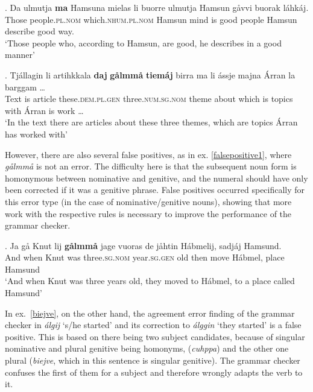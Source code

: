 \documentclass[free]{flammie}
\begin{document}
\exg. Da ulmutja \textbf{ma} Hamsuna mielas li buorre ulmutja Hamsun gåvvi
buorak láhkáj.\label{msyn-mij-gut}\\
Those people\textsc{.pl.nom} which\textsc{.nhum.pl.nom} Hamsun mind is good
people Hamsun describe good way.\\
`Those people who, according to Hamsun, are good, he describes in a good manner'


\exg. Tjállagin li artihkkala \textbf{daj} \textbf{gålmmå} \textbf{tiemáj} birra
ma li ássje majna Árran la barggam \ldots\label{numeral-error}\\
Text is article these\textsc{.dem.pl.gen} three\textsc{.num.sg.nom} theme about
which is topics with Árran is work \ldots\\
`In the text there are articles about these three themes, which are topics Árran
has worked with'




















However, there are also several false positives, as in ex. \ref{falsepositive1},
where \textit{gålmmå} is not an error. The difficulty here is that the
subsequent noun form is homonymous between nominative and genitive, and the
numeral should have only been corrected if it was a genitive phrase.
False positives occurred specifically for this error type (in the case of
nominative/genitive nouns), showing that more work with the respective rules is
necessary to improve the performance of the grammar checker.


\exg. Ja gå Knut lij \textbf{gålmmå} jage vuoras de jåhtin Hábmelij, sadjáj
Hamsund.\label{falsepositive1}\\
And when Knut was three\textsc{.sg.nom} year\textsc{.sg.gen} old then move
Hábmel, place Hamsund\\
`And when Knut was three years old, they moved to Hábmel, to a place called
Hamsund'






In ex.~\ref{biejve}, on the other hand, the agreement error finding of the
grammar checker in \textit{álgij} `s/he started' and its correction to
\textit{álggin} `they started' is a false positive. This is based on there being
two subject candidates, because of singular nominative and plural genitive being
homonyms, (\textit{cuhppa}) and the other one plural (\textit{biejve}, which in
this sentence is singular genitive). The grammar checker confuses the first of
them for a subject and therefore wrongly adapts the verb to it.
\end{document}
